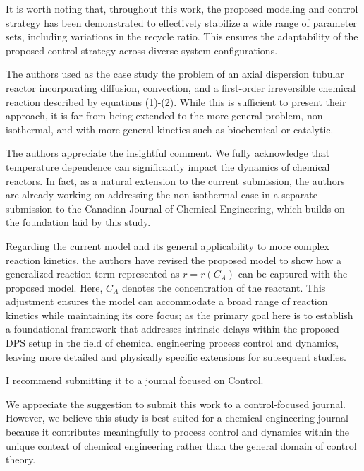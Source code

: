 \documentclass[11pt,answers]{exam}
\begin{document}
\begin{questions}
\begin{solutionorbox}
        It is worth noting that, throughout this work, the proposed modeling and control strategy has been demonstrated to effectively stabilize a wide range of parameter sets, including variations in the recycle ratio. This ensures the adaptability of the proposed control strategy across diverse system configurations.
    \end{solutionorbox}

    
    \question The authors used as the case study the problem of an axial dispersion tubular reactor incorporating diffusion, convection, and a first-order irreversible chemical reaction described by equations (1)-(2). While this is sufficient to present their approach, it is far from being extended to the more general problem, non-isothermal, and with more general kinetics such as biochemical or catalytic.

    \begin{solutionorbox} \label{comment:2_3}
        The authors appreciate the insightful comment. We fully acknowledge that temperature dependence can significantly impact the dynamics of chemical reactors. In fact, as a natural extension to the current submission, the authors are already working on addressing the non-isothermal case in a separate submission to the Canadian Journal of Chemical Engineering, which builds on the foundation laid by this study.

        Regarding the current model and its general applicability to more complex reaction kinetics, the authors have revised the proposed model to show how a generalized reaction term represented as \( r = r(C_A) \) can be captured with the proposed model. Here, \( C_A \) denotes the concentration of the reactant. This adjustment ensures the model can accommodate a broad range of reaction kinetics while maintaining its core focus; as the primary goal here is to establish a foundational framework that addresses intrinsic delays within the proposed DPS setup in the field of chemical engineering process control and dynamics, leaving more detailed and physically specific extensions for subsequent studies.        
    \end{solutionorbox}


    \question I recommend submitting it to a journal focused on Control.

    \begin{solutionorbox} \label{comment:2_4}
        We appreciate the suggestion to submit this work to a control-focused journal. However, we believe this study is best suited for a chemical engineering journal because it contributes meaningfully to process control and dynamics within the unique context of chemical engineering rather than the general domain of control theory.


\end{solutionorbox}
\end{questions}
\end{document}
